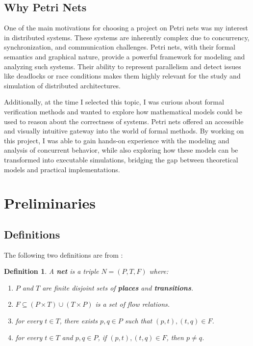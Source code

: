 \documentclass[12pt]{article}
\newtheorem{definition}{Definition}
\begin{document}
    \subsection{Why Petri Nets}
    One of the main motivations for choosing a project on Petri nets was my interest in distributed systems. These systems are inherently complex due to concurrency, synchronization, and communication challenges. Petri nets, with their formal semantics and graphical nature, provide a powerful framework for modeling and analyzing such systems. Their ability to represent parallelism and detect issues like deadlocks or race conditions makes them highly relevant for the study and simulation of distributed architectures.

    Additionally, at the time I selected this topic, I was curious about formal verification methods and wanted to explore how mathematical models could be used to reason about the correctness of systems. Petri nets offered an accessible and visually intuitive gateway into the world of formal methods. By working on this project, I was able to gain hands-on experience with the modeling and analysis of concurrent behavior, while also exploring how these models can be transformed into executable simulations, bridging the gap between theoretical models and practical implementations.

\section{Preliminaries}
    \subsection{Definitions}
    The following two definitions are from  \cite{rozenberg1996elementary}:
    \begin{definition}
        A \textbf{net} is a triple \(N=(P,T,F)\) where: 
        \begin{enumerate}
            \item \(P\) and \(T\) are finite disjoint sets of \textbf{places} and \textbf{transitions}.
            \item \(F \subseteq (P \times T)\cup(T \times P)\) is a set of flow relations.
            \item for every \(t \in T\), there exists $p,q \in P$ such that $(p,t),(t,q) \in F$.
            \item for every $t \in T$ and $p,q \in P$, if $(p,t),(t,q) \in F$, then $p \neq q$.
        \end{enumerate}
    \end{definition}
\end{document}
